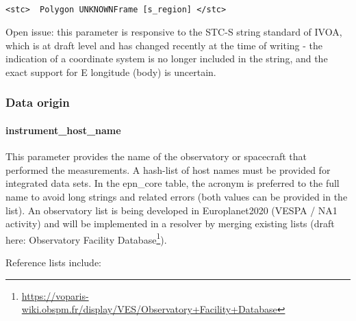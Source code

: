 \documentclass[11pt,a4paper]{ivoa}
\begin{document}
\begin{verbatim}

<stc>  Polygon UNKNOWNFrame [s_region] </stc>

\end{verbatim}

Open issue: this parameter is responsive to the STC-S string standard of IVOA, which is at draft level and has changed recently at the time of writing - the indication of a coordinate system is no longer included in the string, and the exact support for E longitude (body) is uncertain.

\subsubsection{Data origin}

\paragraph{instrument\_host\_name}

This parameter provides the name of the observatory or spacecraft that performed the measurements. A hash-list of host names must be provided for integrated data sets. In the epn\_core table, the acronym is preferred to the full name to avoid long strings and related errors (both values can be provided in the list). An observatory list is being developed in Europlanet2020 (VESPA / NA1 activity) and will be implemented in a resolver by merging existing lists (draft here: Observatory Facility Database\footnote{\url{https://voparis-wiki.obspm.fr/display/VES/Observatory+Facility+Database}}).

Reference lists include:
\end{document}
